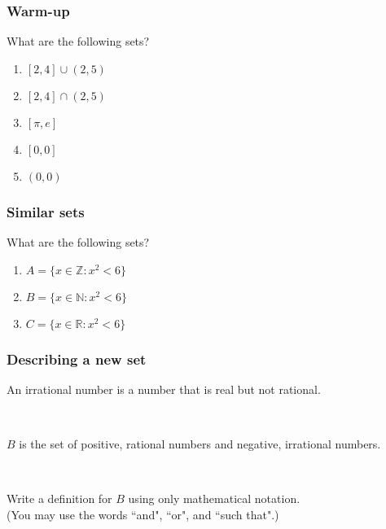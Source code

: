 \documentclass[14pt]{beamer}
\date{}
\title{}
\author{}
\newcommand {\DS} [1] {${\displaystyle #1}$}
\newcommand {\R}{\mathbb{R}}
\newcommand {\Z}{\mathbb{Z}}
\newcommand {\N}{\mathbb{N}}
\begin{document}



\begin{frame}
\frametitle{Warm-up}

What are the following sets?

\begin{enumerate} 
	\item  $[2,4] \cup (2,5)$
	\item  $[2,4] \cap (2,5)$
	\item  $[\pi,e]$
	\item  $[0,0]$
	\item  $(0,0)$
\end{enumerate}
\end{frame}




\begin{frame}
\frametitle{Similar sets}

What are the following sets? 

	\begin{enumerate} 
		\item  \DS{A = \{ x \in \Z : x^2 < 6\} }
		\item  \DS{B = \{ x \in \N : x^2 < 6\} }
		\item  \DS{C = \{ x \in \R : x^2 < 6\} }
	\end{enumerate}
\end{frame}


\begin{frame}
\frametitle{Describing a new set}

An irrational number is a number that is real but not rational.

\


$B$ is the set of positive, rational numbers and negative, irrational numbers.

\

Write a definition for $B$ using only mathematical notation. \\
 (You may use the words ``and", ``or", and ``such that".)
 \end{frame}

\end{document}
